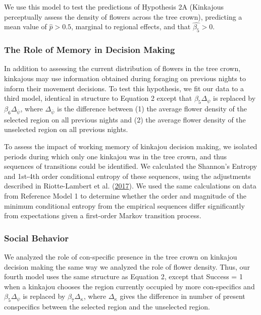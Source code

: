 \documentclass[twoside,12pt,final]{ucthesis-CA2012}
\begin{document}
\begin{ucmainmatter}
We use this model to test the predictions of Hypothesis 2A (Kinkajous perceptually assess the density of flowers across the tree crown), predicting a mean value of \(\hat{p} > 0.5\), marginal to regional effects, and that \(\hat{\beta_5} > 0\).

\hypertarget{the-role-of-memory-in-decision-making}{%
\subsubsection{The Role of Memory in Decision Making}\label{the-role-of-memory-in-decision-making}}

In addition to assessing the current distribution of flowers in the tree crown, kinkajous may use information obtained during foraging on previous nights to inform their movement decisions. To test this hypothesis, we fit our data to a third model, identical in structure to Equation 2 except that \(\beta_5\Delta_\psi\) is replaced by \(\beta_6\Delta_{\overline{\psi}}\), where \(\Delta_{\overline{\psi}}\) is the difference between (1) the average flower density of the selected region on all previous nights and (2) the average flower density of the unselected region on all previous nights.

To assess the impact of working memory of kinkajou decision making, we isolated periods during which only one kinkajou was in the tree crown, and thus sequences of transitions could be identified. We calculated the Shannon's Entropy and 1st-4th order conditional entropy of these sequences, using the adjustments described in Riotte-Lambert et al. (\protect\hyperlink{ref-riotte-lambert2017}{2017}). We used the same calculations on data from Reference Model 1 to determine whether the order and magnitude of the minimum conditional entropy from the empirical sequences differ significantly from expectations given a first-order Markov transition process.

\hypertarget{social-behavior}{%
\subsubsection{Social Behavior}\label{social-behavior}}

We analyzed the role of con-specific presence in the tree crown on kinkajou decision making the same way we analyzed the role of flower density. Thus, our fourth model uses the same structure as Equation 2, except that Success = 1 when a kinkajou chooses the region currently occupied by more con-specifics and \(\beta_5\Delta_{\psi}\) is replaced by \(\beta_7\Delta_{\kappa}\), where \(\Delta_{\kappa}\) gives the difference in number of present conspecifics between the selected region and the unselected region.


\end{ucmainmatter}
\end{document}
